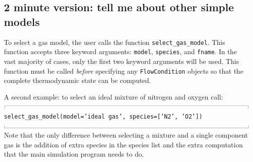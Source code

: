 \documentclass[12pt,a4paper,twoside]{article}
\newcommand{\topbar}{\ensuremath{
    \rule{0.1mm}{2.0mm} \rule[2.0mm]{159.5mm}{0.1mm} \rule{0.1mm}{2.0mm}
}}
\newcommand{\bottombar}{\ensuremath{
    \rule{0.1mm}{2.0mm} \rule{159.5mm}{0.1mm} \rule{0.1mm}{2.0mm}
}}
\begin{document}
\subsection{2 minute version: tell me about other simple models}

To select a gas model, the user calls the function
\texttt{select\_gas\_model}.
This function accepts three keyword arguments: \texttt{model},
\texttt{species}, and \texttt{fname}.
In the vast majority of cases, only the first
two keyword arguments will be used.
This function must be called \emph{before} specifying any \texttt{FlowCondition} objects
so that the complete thermodynamic state can be computed.

\medskip
A second example: to select an ideal mixture of nitrogen and oxygen
call:\\
%
\topbar\\
\texttt{select\_gas\_model(model='ideal gas', species=['N2', 'O2'])}\\
\bottombar\\
%
Note that the only difference between selecting a mixture and a single
component gas is the addition of extra species in the species list and the extra computation that
the main simulation program needs to do.
\end{document}
